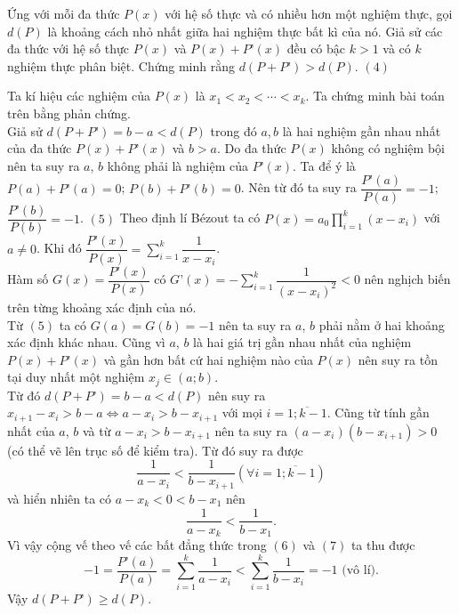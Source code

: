 \begin{bt}%
	Ứng với mỗi đa thức $P(x)$ với hệ số thực và có nhiều hơn một nghiệm thực, gọi $d(P)$ là khoảng cách nhỏ nhất giữa hai nghiệm thực bất kì của nó. Giả sử các đa thức với hệ số thực $P(x)$ và $P(x)+P’(x)$ đều có bậc $k>1$ và có $k$ nghiệm thực phân biệt. Chứng minh rằng $d(P+P’)>d(P)$.  \hfill $(4)$
	\begin{cm}
		Ta kí hiệu các nghiệm của $P(x)$ là $x_1<x_2<\cdots<x_k$. Ta chứng minh bài toán trên bằng phản chứng.\\
		Giả sử $d(P+P’)=b-a<d(P)$ trong đó $a,b$ là hai nghiệm gần nhau nhất của đa thức $P(x)+P’(x)$ và $b>a$. Do đa thức $P(x)$ không có nghiệm bội nên ta suy ra $a$, $b$ không phải là nghiệm của $P’(x)$. Ta để ý là $P(a)+P’(a)=0$; $P(b)+P’(b)=0$. Nên từ đó ta suy ra $\dfrac{P’(a)}{P(a)}=-1$; $\dfrac{P’(b)}{P(b)}=-1$. \hfill $(5)$
		Theo định lí Bézout ta có $P(x)=a_0\prod\limits_{i=1}^k{\left(x-x_i\right)}$ với $a\ne 0$. Khi đó $\dfrac{P’(x)}{P(x)}=\displaystyle\sum\limits_{i=1}^k \dfrac{1}{x-x_i}$.\\
		Hàm số $G(x)= \dfrac{P’(x)}{P(x)}$ có $G’(x)=-\displaystyle\sum\limits_{i=1}^k \dfrac{1}{(x-x_i)^2}<0$ nên nghịch biến trên từng khoảng xác định của nó.\\
		Từ $(5)$ ta có $G(a)=G(b)=-1$ nên ta suy ra $a$, $b$ phải nằm ở hai khoảng xác định khác nhau. Cũng vì $a$, $b$ là hai giá trị gần nhau nhất của nghiệm $P(x)+P’(x)$ và gần hơn bất cứ hai nghiệm nào của $P(x)$ nên suy ra tồn tại duy nhất một nghiệm $x_j \in (a;b)$.\\
		Từ đó $d(P+P’)=b-a<d(P)$ nên suy ra $x_{i+1}-x_i>b-a\Leftrightarrow a-x_i>b-x_{i+1}$ với mọi $i=\overline{1;k-1}$. Cũng từ tính gần nhất của $a$, $b$ và từ $a-x_i>b-x_{i+1}$ nên ta suy ra $\left(a-x_i\right)\left(b-{x}_{i+1}\right)>0$ (có thể vẽ lên trục số để kiểm tra). Từ đó suy ra được 
		\[\dfrac{1}{a-x_i}<\dfrac{1}{b-{x}_{i+1}}\left(\forall i=\overline{1;k-1}\right) \tag{6}\] 
		và hiển nhiên ta có $a-x_k<0<b-x_1$ nên 
		\[\dfrac{1}{a-x_k}<\dfrac{1}{b-x_1}. \tag{7}\] 
		Vì vậy cộng vế theo vế các bất đẳng thức trong $(6)$ và $(7)$ ta thu được $$-1=\dfrac{P’(a)}{P(a)}= \displaystyle\sum\limits_{i=1}^k \dfrac{1}{a-x_i}<\displaystyle\sum\limits_{i=1}^k \dfrac{1}{b-x_i}=-1 \text{ (vô lí)}.$$
		Vậy $d(P+P’)\ge d(P)$.
	\end{cm}	
\end{bt}

